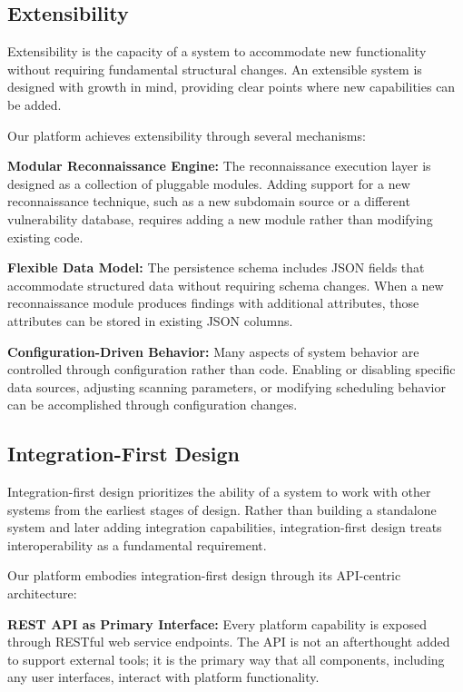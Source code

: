 \documentclass[a4paper,12pt]{report}
\begin{document}
\subsection{Extensibility}

Extensibility is the capacity of a system to accommodate new functionality without requiring fundamental structural changes. An extensible system is designed with growth in mind, providing clear points where new capabilities can be added.\hfill \break


Our platform achieves extensibility through several mechanisms:\hfill \break

\textbf{Modular Reconnaissance Engine:} The reconnaissance execution layer is designed as a collection of pluggable modules. Adding support for a new reconnaissance technique, such as a new subdomain source or a different vulnerability database, requires adding a new module rather than modifying existing code.\hfill \break

\textbf{Flexible Data Model:} The persistence schema includes JSON fields that accommodate structured data without requiring schema changes. When a new reconnaissance module produces findings with additional attributes, those attributes can be stored in existing JSON columns.\hfill \break

\textbf{Configuration-Driven Behavior:} Many aspects of system behavior are controlled through configuration rather than code. Enabling or disabling specific data sources, adjusting scanning parameters, or modifying scheduling behavior can be accomplished through configuration changes.\hfill \break

\subsection{Integration-First Design}

Integration-first design prioritizes the ability of a system to work with other systems from the earliest stages of design. Rather than building a standalone system and later adding integration capabilities, integration-first design treats interoperability as a fundamental requirement.\hfill \break

Our platform embodies integration-first design through its API-centric architecture:\hfill \break

\textbf{REST API as Primary Interface:} Every platform capability is exposed through RESTful web service endpoints.\cite{rest_api_best_practices} The API is not an afterthought added to support external tools; it is the primary way that all components, including any user interfaces, interact with platform functionality.\hfill \break
\end{document}
